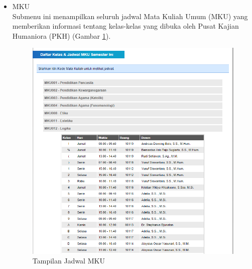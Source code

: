 \documentclass[a4paper,twoside]{article}
\begin{document}
\begin{enumerate}
\begin{enumerate}
\begin{enumerate}
\begin{itemize}
\begin{itemize}
			\item MKU \\
			Submenu ini menampilkan seluruh jadwal Mata Kuliah Umum (MKU) yang memberikan informasi tentang kelas-kelas yang dibuka oleh Pusat Kajian Humaniora (PKH) (Gambar \ref{fig:3_pam_utama_jadwalmku}). 
			\begin{figure}[H]
				\centering
				\includegraphics[scale=0.5]{Gambar/pam-utama-jadwalmku}
				\caption{Tampilan Jadwal MKU} 
				\label{fig:3_pam_utama_jadwalmku}
			\end{figure}
			

\end{itemize}
\end{itemize}
\end{enumerate}
\end{enumerate}
\end{enumerate}
\end{document}
